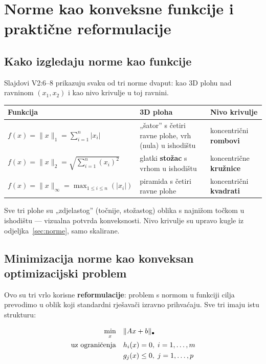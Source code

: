 \section{Norme kao konveksne funkcije i praktične reformulacije}

\subsection{Kako izgledaju norme kao funkcije}

Slajdovi V2:6--8 prikazuju svaku od tri norme dvaput: kao 3D plohu nad
ravninom $(x_1,x_2)$ i kao nivo krivulje u toj ravnini.

\begin{center}
\begin{tabular}{P{3.3cm}P{4.6cm}P{4.8cm}}
\toprule
\textbf{Funkcija} & \textbf{3D ploha} & \textbf{Nivo krivulje} \\
\midrule
$f(x) = \|x\|_1 = \sum_{i=1}^{n}|x_i|$
  & „šator” s četiri ravne plohe, vrh (nula) u ishodištu
  & koncentrični \textbf{rombovi} \\
$f(x) = \|x\|_2 = \sqrt{\sum_{i=1}^n (x_i)^2}$
  & glatki \textbf{stožac} s vrhom u ishodištu
  & koncentrične \textbf{kružnice} \\
$f(x) = \|x\|_\infty = \max_{1\le i\le n}(|x_i|)$
  & piramida s četiri ravne plohe
  & koncentrični \textbf{kvadrati} \\
\bottomrule
\end{tabular}
\end{center}

Sve tri plohe su „zdjelastog” (točnije, stožastog) oblika s najnižom točkom u
ishodištu --- vizualna potvrda konveksnosti. Nivo krivulje su upravo kugle iz
odjeljka~\ref{sec:norme}, samo skalirane.

\subsection{Minimizacija norme kao konveksan optimizacijski problem}
\label{sec:norme-reformulacije}

Ovo su tri vrlo korisne \textbf{reformulacije}: problem s normom u funkciji
cilja prevodimo u oblik koji standardni rješavači izravno prihvaćaju. Sve tri
imaju istu strukturu:

\[
\begin{aligned}
\min_x \quad & \|Ax + b\|_{\bullet} \\
\uzogr & h_i(x) = 0,\; i=1,\dots,m \\
& g_j(x) \le 0,\; j = 1,\dots,p
\end{aligned}
\]

